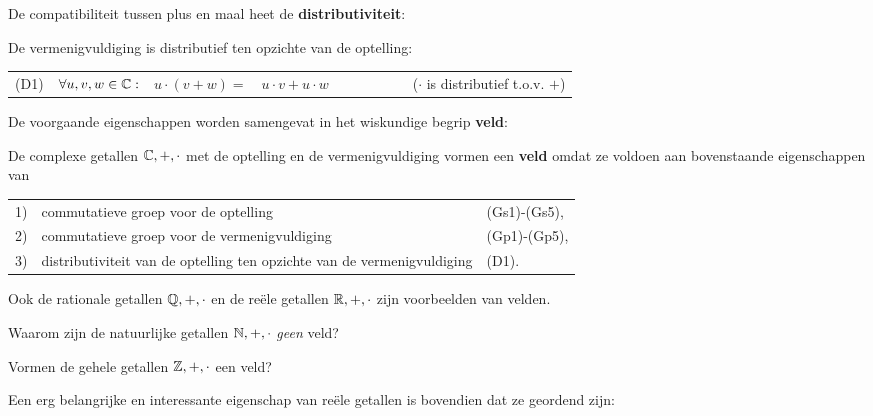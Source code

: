 \documentclass{ximera}
\begin{document}
    De compatibiliteit tussen plus en maal heet de \textbf{distributiviteit}:

    \begin{proposition} De vermenigvuldiging is distributief ten opzichte van de optelling:

    \begin{tabular}{lrr@{ }llr}
        (D1) & $\forall u,v,w \in\mathbb{C}:$ & $ u \cdot (v+w) = $&$ u\cdot v +u\cdot w$  & $\qquad\qquad$& ($\cdot$ is distributief t.o.v. $+$) 
    \end{tabular}
    \end{proposition}

    De voorgaande eigenschappen worden samengevat in het wiskundige begrip \textbf{veld}:

    \begin{definition} De complexe getallen $\mathbb{C},+,\cdot$ met de optelling en de vermenigvuldiging vormen een \textbf{veld} omdat ze voldoen aan bovenstaande eigenschappen 
        van 
        
        \begin{tabular}{lll}
            1) & commutatieve groep voor de optelling  & (Gs1)-(Gs5),  \\
            2) & commutatieve groep voor de vermenigvuldiging  & (Gp1)-(Gp5), \\
            3) & distributiviteit van de optelling ten opzichte van de vermenigvuldiging  & (D1).
        \end{tabular}
    \end{definition}

    Ook de rationale getallen $\mathbb{Q},+,\cdot$ en de reële getallen $\mathbb{R},+,\cdot$ zijn voorbeelden van velden.

    \vspace{0.3cm} %

    \begin{quickquestion*}{} Waarom zijn de natuurlijke getallen $\mathbb{N},+,\cdot$ \textit{geen} veld? \end{quickquestion*}
    \begin{quickquestion*}{} Vormen de gehele getallen $\mathbb{Z},+,\cdot$ een veld? \end{quickquestion*}

    \vspace{0.3cm} %


    Een erg belangrijke en interessante eigenschap van reële getallen is bovendien dat ze geordend zijn:
\end{document}
